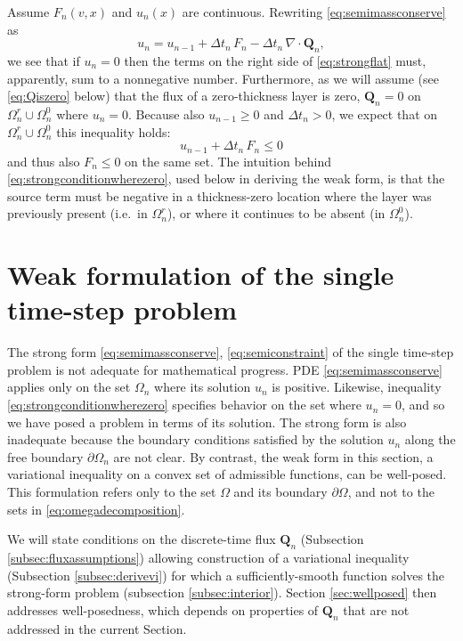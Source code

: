 \documentclass[final,onefignum]{siamart190516}
\newcommand\bQ{\mathbf{Q}}
\newcommand{\Div}{\nabla\cdot}
\begin{document}
Assume $F_n(v,x)$ and $u_n(x)$ are continuous.  Rewriting \eqref{eq:semimassconserve} as
\begin{equation}
u_n = u_{n-1} + \Delta t_n\, F_n - \Delta t_n\, \Div \bQ_n,  \label{eq:strongflat}
\end{equation}
we see that if $u_n=0$ then the terms on the right side of \eqref{eq:strongflat} must, apparently, sum to a nonnegative number.  Furthermore, as we will assume (see \eqref{eq:Qiszero} below) that the flux of a zero-thickness layer is zero, $\bQ_n=0$ on $\Omega_n^r \cup \Omega_n^0$ where $u_n=0$.  Because also $u_{n-1}\ge 0$ and $\Delta t_n > 0$, we expect that on $\Omega_n^r \cup \Omega_n^0$ this inequality holds:
\begin{equation}
u_{n-1} + \Delta t_n\, F_n \le 0 \label{eq:strongconditionwherezero}
\end{equation}
and thus also $F_n \le 0$ on the same set.  The intuition behind \eqref{eq:strongconditionwherezero}, used below in deriving the weak form, is that the source term must be negative in a thickness-zero location where the layer was previously present (i.e.~in $\Omega_n^r$), or where it continues to be absent (in $\Omega_n^0$).


\section{Weak formulation of the single time-step problem}  \label{sec:weakform}

The strong form \eqref{eq:semimassconserve}, \eqref{eq:semiconstraint} of the single time-step problem is not adequate for mathematical progress.  PDE \eqref{eq:semimassconserve} applies only on the set $\Omega_n$ where its solution $u_n$ is positive.  Likewise, inequality \eqref{eq:strongconditionwherezero} specifies behavior on the set where $u_n=0$, and so we have posed a problem in terms of its solution.  The strong form is also inadequate because the boundary conditions satisfied by the solution $u_n$ along the free boundary $\partial\Omega_n$ are not clear.  By contrast, the weak form in this section, a variational inequality \cite{Friedman1982,KinderlehrerStampacchia1980} on a convex set of admissible functions, can be well-posed.  This formulation refers only to the set $\Omega$ and its boundary $\partial\Omega$, and not to the sets in \eqref{eq:omegadecomposition}.

We will state conditions on the discrete-time flux $\bQ_n$ (Subsection \ref{subsec:fluxassumptions}) allowing construction of a variational inequality (Subsection \ref{subsec:derivevi}) for which a sufficiently-smooth function solves the strong-form problem (subsection \ref{subsec:interior}).  Section \ref{sec:wellposed} then addresses well-posedness, which depends on properties of $\bQ_n$ that are not addressed in the current Section.
\end{document}
